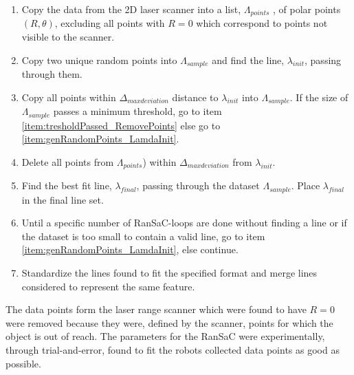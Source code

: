 \begin{enumerate}
\item Copy the data from the 2D laser scanner into a list, $ \Lambda_{points} $ ,
of polar points $ (R,\theta) $, excluding all points with $ R = 0 $ which correspond to points not visible to the scanner.
\item Copy two unique random points into $ \Lambda_{sample} $ and find the line, $ \lambda_{init} $, passing through them.\label{item:genRandomPoints_LamdaInit}
\item Copy all points within $ \Delta_{max deviation} $ distance to $ \lambda_{init} $ into $ \Lambda_{sample} $.
If the size of $ \Lambda_{sample} $ passes a minimum threshold,
go to item \ref{item:tresholdPassed_RemovePoints}
else go to \ref{item:genRandomPoints_LamdaInit}.
\item Delete all points from $ \Lambda_{points} $) within $ \Delta_{max deviation} $ from $ \lambda_{init} $.
\label{item:tresholdPassed_RemovePoints}
\item Find the best fit line, $ \lambda_{final} $,
passing through the dataset $ \Lambda_{sample} $. Place $ \lambda_{final} $ in the final line set.
\item Until a specific number of RanSaC-loops are done without finding a line
or if the dataset is too small to contain a valid line,
go to item \ref{item:genRandomPoints_LamdaInit},
else continue.
\item Standardize the lines found to fit the specified format and merge lines considered to represent the same feature.
\end{enumerate}

The data points form the laser range scanner which were found to have $ R = 0 $
were removed because they were, defined by the scanner, points for which the object is out of reach.
The parameters for the RanSaC were experimentally, through trial-and-error,
found to fit the robots collected data points as good as possible.
